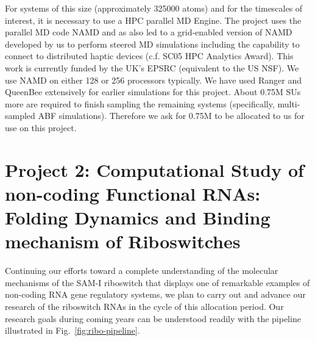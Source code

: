\documentclass[a4paper,10pt]{article}
\begin{document}
For systems of this size (approximately 325000 atoms) and for the timescales of interest, it is necessary to use a HPC parallel MD Engine.  The project uses the parallel MD code NAMD and as also led to a grid-enabled version of NAMD developed by us to perform steered MD simulations including the capability to connect to distributed haptic devices (c.f. SC05 HPC Analytics Award). This work is currently funded by the UK's EPSRC (equivalent to the US NSF).  We use NAMD on either 128 or 256 processors typically.  We have used Ranger and QueenBee extensively for earlier simulations for this project.  About 0.75M SUs more are required to finish sampling the remaining systems (specifically, multi-sampled ABF simulations).  Therefore we ask for 0.75M to be allocated to us for use on this project.  




\section*{Project 2: Computational Study of non-coding Functional RNAs: Folding Dynamics and Binding mechanism of Riboswitches}

Continuing our efforts toward a complete understanding of the molecular mechanisms of the SAM-I riboswitch that displays one of remarkable examples of non-coding RNA gene regulatory systems, we plan to carry out and advance our research of the riboswitch RNAs in the cycle of this allocation period.  Our research goals during coming years can be understood readily with the pipeline illustrated in Fig.~\ref{fig:ribo-pipeline}. 
\end{document}
